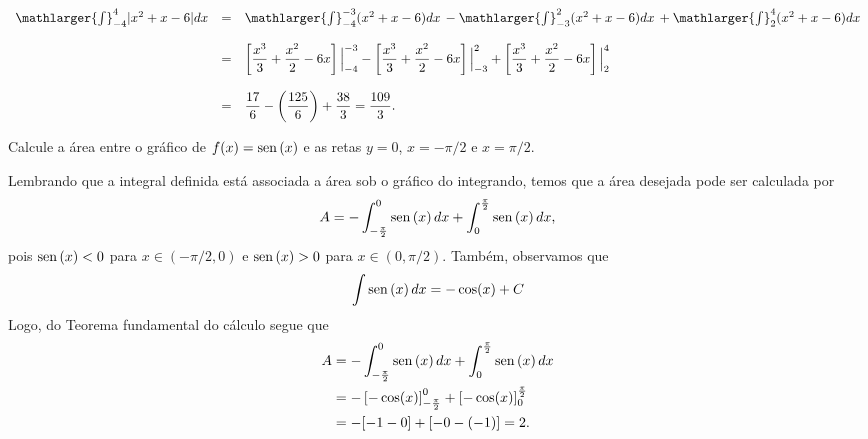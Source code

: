 \cleardoublepage\documentclass[../main.tex]{subfiles}
\begin{document}
\begin{exeresol}
\begin{compactenum}[a)]
\begin{solution}
\[ \begin{array}{rcl} \mathlarger{\int}^{4}_{-4}|x^2+x-6|dx &=& \mathlarger{\int}^{-3}_{-4}(x^2+x-6)dx\,- \mathlarger{\int}^{2}_{-3}(x^2+x-6)dx\, + \mathlarger{\int}^{4}_{2}(x^2+x-6)dx\\ \\ &=& \left[\dfrac{x^3}{3}+ \dfrac{x^2}{2}-6x \right]\Big{|}^{-3}_{-4} - \left[\dfrac{x^3}{3}+ \dfrac{x^2}{2}-6x \right]\Big{|}^{2}_{-3} + \left[\dfrac{x^3}{3}+ \dfrac{x^2}{2}-6x \right]\Big{|}^{4}_{2}\\ \\ &=&\dfrac{17}{6} - \left(\dfrac{125}{6}\right) +\dfrac{38}{3}=\dfrac{109}{3}. \end{array} \]
  \end{solution}
  \end{compactenum}
\end{exeresol}




\begin{exeresol}
  Calcule a área entre o gráfico de $f(x) = \operatorname{sen}\,(x)$ e as retas $y=0$, $x=-\pi/2$ e $x=\pi/2$.
\end{exeresol}
\begin{resol}
  Lembrando que a integral definida está associada a área sob o gráfico do integrando, temos que a área desejada pode ser calculada por
  \begin{equation*}
    A = - \int_{-\frac{\pi}{2}}^0 \operatorname{sen}\,(x)\,dx + \int_0^{\frac{\pi}{2}} \operatorname{sen}\,(x)\,dx,
  \end{equation*}
  pois $\operatorname{sen}\,(x) < 0$ para $x\in (-\pi/2, 0)$ e $\operatorname{sen}\,(x) > 0$ para $x\in (0, \pi/2)$.
  Também, observamos que
  \begin{equation*}
    \int \operatorname{sen}\,(x)\,dx = -\cos(x) + C
  \end{equation*}
  Logo, do Teorema fundamental do cálculo segue que
  \begin{align*}
    A &= - \int_{-\frac{\pi}{2}}^0 \operatorname{sen}\,(x)\,dx + \int_0^{\frac{\pi}{2}} \operatorname{sen}\,(x)\,dx \\
      &= -\left[-\cos(x)\right]_{-\frac{\pi}{2}}^0 + \left[-\cos(x)\right]_0^{\frac{\pi}{2}} \\
      &= -[-1 - 0] + [-0 - (-1)] = 2. 
  \end{align*}
\end{resol}
\end{document}
